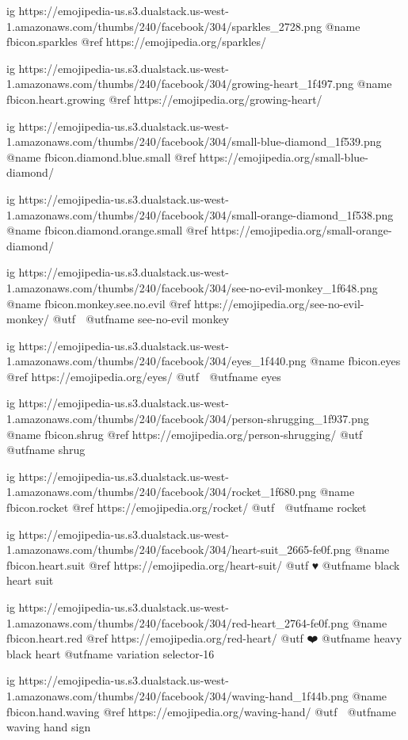   ig https://emojipedia-us.s3.dualstack.us-west-1.amazonaws.com/thumbs/240/facebook/304/sparkles_2728.png
  @name fbicon.sparkles
  @ref https://emojipedia.org/sparkles/

  ig https://emojipedia-us.s3.dualstack.us-west-1.amazonaws.com/thumbs/240/facebook/304/growing-heart_1f497.png
  @name fbicon.heart.growing
  @ref https://emojipedia.org/growing-heart/

  ig https://emojipedia-us.s3.dualstack.us-west-1.amazonaws.com/thumbs/240/facebook/304/small-blue-diamond_1f539.png
  @name fbicon.diamond.blue.small
  @ref https://emojipedia.org/small-blue-diamond/

  ig https://emojipedia-us.s3.dualstack.us-west-1.amazonaws.com/thumbs/240/facebook/304/small-orange-diamond_1f538.png
  @name fbicon.diamond.orange.small
  @ref https://emojipedia.org/small-orange-diamond/

  ig https://emojipedia-us.s3.dualstack.us-west-1.amazonaws.com/thumbs/240/facebook/304/see-no-evil-monkey_1f648.png
  @name fbicon.monkey.see.no.evil
  @ref https://emojipedia.org/see-no-evil-monkey/
  @utf 🙈
  @utfname see-no-evil monkey

  ig https://emojipedia-us.s3.dualstack.us-west-1.amazonaws.com/thumbs/240/facebook/304/eyes_1f440.png
  @name fbicon.eyes
  @ref https://emojipedia.org/eyes/
  @utf 👀
  @utfname eyes

  ig https://emojipedia-us.s3.dualstack.us-west-1.amazonaws.com/thumbs/240/facebook/304/person-shrugging_1f937.png
  @name fbicon.shrug
  @ref https://emojipedia.org/person-shrugging/
  @utf 🤷
  @utfname shrug

  ig https://emojipedia-us.s3.dualstack.us-west-1.amazonaws.com/thumbs/240/facebook/304/rocket_1f680.png
  @name fbicon.rocket
  @ref https://emojipedia.org/rocket/
  @utf 🚀
  @utfname rocket

  ig https://emojipedia-us.s3.dualstack.us-west-1.amazonaws.com/thumbs/240/facebook/304/heart-suit_2665-fe0f.png
  @name fbicon.heart.suit
  @ref https://emojipedia.org/heart-suit/
  @utf ♥️
  @utfname black heart suit


  ig https://emojipedia-us.s3.dualstack.us-west-1.amazonaws.com/thumbs/240/facebook/304/red-heart_2764-fe0f.png
  @name fbicon.heart.red
  @ref https://emojipedia.org/red-heart/
  @utf ❤️
  @utfname heavy black heart 
  @utfname variation selector-16

  ig https://emojipedia-us.s3.dualstack.us-west-1.amazonaws.com/thumbs/240/facebook/304/waving-hand_1f44b.png
  @name fbicon.hand.waving
  @ref https://emojipedia.org/waving-hand/
  @utf 👋
  @utfname waving hand sign

